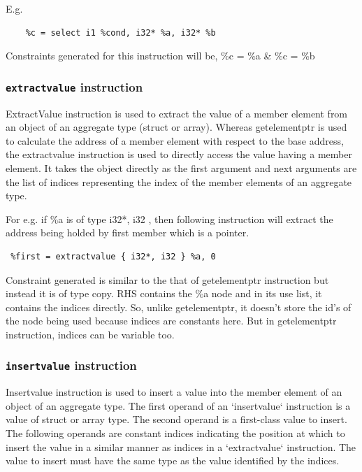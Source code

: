 \documentclass[a4paper,12pt]{report}
\begin{document}
E.g.
\begin{lstlisting}
    %c = select i1 %cond, i32* %a, i32* %b
\end{lstlisting}

Constraints generated for this instruction will be, \%c = \%a \& \%c = \%b

\subsubsection{\texttt{extractvalue} instruction}
ExtractValue instruction is used to extract the value of a member element from 
an object of an aggregate type (struct or array). Whereas getelementptr is used 
to calculate the address of a member element with respect to the base address, 
the extractvalue instruction is used to directly access the value having a 
member element. It takes the object directly as the first argument and next 
arguments are the list of indices representing the index of the member 
elements of an aggregate type.

For e.g. if \%a is of type { i32*, i32 }, then 
following instruction will extract the address being holded by first member 
which is a pointer.

\begin{lstlisting}
 %first = extractvalue { i32*, i32 } %a, 0
\end{lstlisting}

Constraint generated is similar to the that of getelementptr instruction but 
instead it is of type copy. RHS contains the \%a node and in its use list, it 
contains the indices directly. So, unlike getelementptr, it doesn't store the 
id's of the node being used because indices are constants here. But in 
getelementptr instruction, indices can be variable too.

\subsubsection{\texttt{insertvalue} instruction}
Insertvalue instruction is used to insert a value into the member element of an 
object of an aggregate type.
The first operand of an ‘insertvalue‘ instruction is a value of struct or array 
type. The second operand is a first-class value to insert. The following 
operands are constant indices indicating the position at which to insert the 
value in a similar manner as indices in a ‘extractvalue‘ instruction. The value 
to insert must have the same type as the value identified by the indices.
\end{document}
